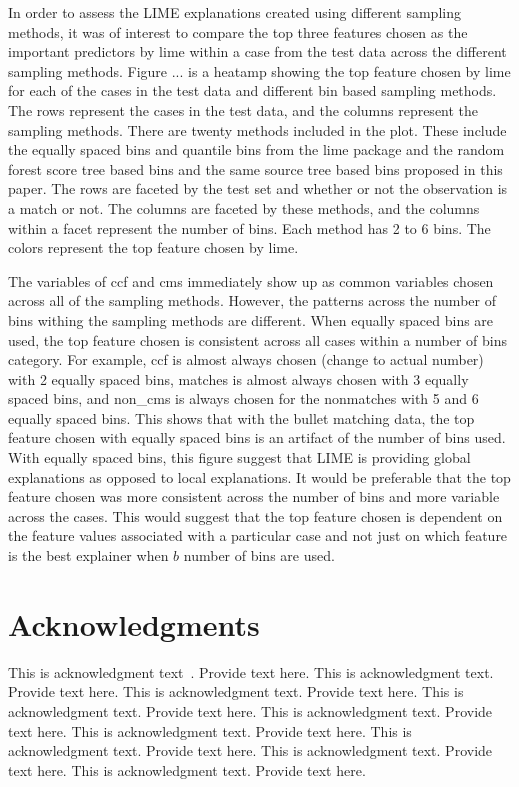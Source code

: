 \documentclass[AMS,STIX2COL]{WileyNJD-v2}
\begin{document}
In order to assess the LIME explanations created using different sampling methods, it was of interest to compare the top three features chosen as the important predictors by lime within a case from the test data across the different sampling methods. Figure ... is a heatamp showing the top feature chosen by lime for each of the cases in the test data and different bin based sampling methods. The rows represent the cases in the test data, and the columns represent the sampling methods. There are twenty methods included in the plot. These include the equally spaced bins and quantile bins from the lime package and the random forest score tree based bins and the same source tree based bins proposed in this paper. The rows are faceted by the test set and whether or not the observation is a match or not. The columns are faceted by these methods, and the columns within a facet represent the number of bins. Each method has 2 to 6 bins. The colors represent the top feature chosen by lime.

The variables of ccf and cms immediately show up as common variables chosen across all of the sampling methods. However, the patterns across the number of bins withing the sampling methods are different. When equally spaced bins are used, the top feature chosen is consistent across all cases within a number of bins category. For example, ccf is almost always chosen (change to actual number) with 2 equally spaced bins, matches is almost always chosen with 3 equally spaced bins, and non\_cms is always chosen for the nonmatches with 5 and 6 equally spaced bins. This shows that with the bullet matching data, the top feature chosen with equally spaced bins is an artifact of the number of bins used. With equally spaced bins, this figure suggest that LIME is providing global explanations as opposed to local explanations. It would be preferable that the top feature chosen was more consistent across the number of bins and more variable across the cases. This would suggest that the top feature chosen is dependent on the feature values associated with a particular case and not just on which feature is the best explainer when $b$ number of bins are used.


\section*{Acknowledgments}
This is acknowledgment text~\cite{Elbaum2002}. Provide text here. This is acknowledgment text. Provide text here. This is acknowledgment text. Provide text here. This is acknowledgment text. Provide text here. This is acknowledgment text. Provide text here. This is acknowledgment text. Provide text here. This is acknowledgment text. Provide text here. This is acknowledgment text. Provide text here. This is acknowledgment text. Provide text here. 
\end{document}
